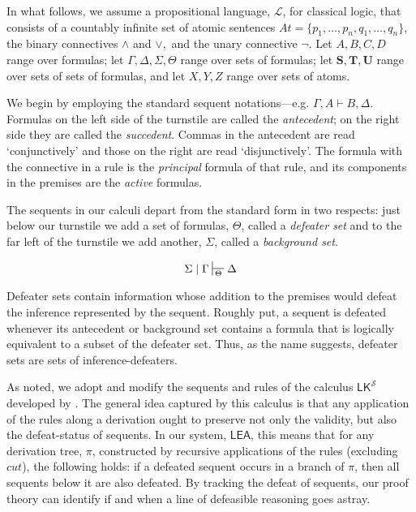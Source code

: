 \documentclass{article}
\theoremstyle{definition}
\theoremstyle{definition}
\theoremstyle{definition}
\theoremstyle{definition}
\theoremstyle{remark}
\theoremstyle{definition}
\theoremstyle{definition}
\begin{document}

In what follows, we assume a propositional language, $ \mathcal{L} $, for classical logic, that consists of a countably infinite set of atomic sentences $At = \{p_1, \ldots,p_n , q_1, \ldots, q_n\}$, the binary connectives $\wedge$ and $ \vee,$ and the unary connective $\neg$. Let $A, B, C, D $ range over formulas; let $ \Gamma, \Delta, \Sigma, \Theta $ range over sets of formulas; let $ \mathbf{S}, \mathbf{T}, \mathbf{U} $ range over sets of sets of formulas, and let $ X, Y, Z $ range over sets of atoms. 

We begin by employing the standard sequent notations---e.g. $\Gamma, A \vdash B, \Delta $. Formulas on the left side of the turnstile are called the \textit{antecedent}; on the right side they are called the \textit{succedent}. Commas in the antecedent are read `conjunctively' and those on the right are read `disjunctively'. The formula with the connective in a rule is the \textit{principal} formula of that rule, and its components in the premises are the \textit{active} formulas. 

The sequents in our calculi depart from the standard form in two respects: just below our turnstile we add a set of formulas, $\Theta $, called a \textit{defeater set} and to the far left of the turnstile we add another, $\Sigma $, called a \textit{background set}.

$$ \Sigma\mid\Gamma\sststile{\Theta}{}\Delta $$

Defeater sets contain information whose addition to the premises would defeat the inference represented by the sequent.  Roughly put, a sequent is defeated whenever its antecedent or background set contains a formula that is logically equivalent to a subset of the defeater set. Thus, as the name suggests, defeater sets are sets of inference-defeaters.  

As noted, we adopt and modify the sequents and rules of the calculus $\mathsf{LK}^\mathcal{S} $ developed by \textcite{Piazza2015}. The general idea captured by this calculus is that any application of the rules along a derivation ought to preserve not only the validity, but also the defeat-status of sequents. In our system, $ \mathsf{LEA} $, this means that for any derivation tree, $\pi$, constructed by recursive applications of the rules (excluding $cut$), the following holds: if a defeated sequent occurs in a branch of $\pi$, then all sequents below it are also defeated. By tracking the defeat of sequents, our proof theory can identify if and when a line of defeasible reasoning goes astray. 
\end{document}
